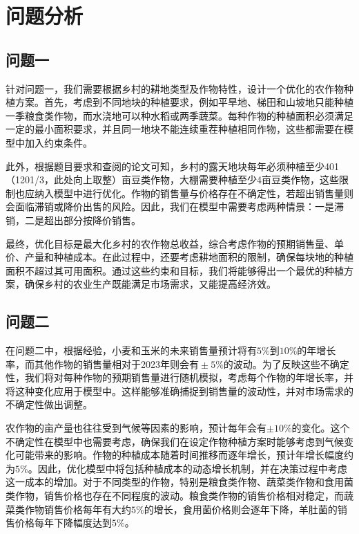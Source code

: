 \chapter[\hspace{0pt}问题分析]{{\heiti{}\hspace{0pt}问题分析}}\label{chapter1: 问题分析}
\removelofgap
\removelotgap

\section[\hspace{-2pt}问题一]{{\heiti{} \hspace{-8pt}问题一}}\label{section1: 问题一}

针对问题一，我们需要根据乡村的耕地类型及作物特性，设计一个优化的农作物种植方案。首先，考虑到不同地块的种植要求，例如平旱地、梯田和山坡地只能种植一季粮食类作物，而水浇地可以种水稻或两季蔬菜。每种作物的种植面积必须满足一定的最小面积要求，并且同一地块不能连续重茬种植相同作物，这些都需要在模型中加入约束条件。

此外，根据题目要求和查阅的论文可知，乡村的露天地块每年必须种植至少401（1201/3，此处向上取整）亩豆类作物，大棚需要种植至少4亩豆类作物，这些限制也应纳入模型中进行优化。作物的销售量与价格存在不确定性，若超出销售量则会面临滞销或降价出售的风险。因此，我们在模型中需要考虑两种情景：一是滞销，二是超出部分按降价销售。

最终，优化目标是最大化乡村的农作物总收益，综合考虑作物的预期销售量、单价、产量和种植成本。在此过程中，还要考虑耕地面积的限制，确保每块地的种植面积不超过其可用面积。通过这些约束和目标，我们将能够得出一个最优的种植方案\cite{JNYZ201508097}，确保乡村的农业生产既能满足市场需求，又能提高经济效。

\section[\hspace{-2pt}问题二]{{\heiti{} \hspace{-8pt}问题二}}\label{section1: 问题二}

在问题二中，根据经验，小麦和玉米的未来销售量预计将有$5\%$到$10\%$的年增长率，而其他作物的销售量相对于2023年则会$有±5\%$的波动。为了反映这些不确定性，我们将对每种作物的预期销售量进行随机模拟，考虑每个作物的年增长率，并将这种变化应用于模型中。这样能够准确捕捉到销售量的波动性，并对市场需求的不确定性做出调整。

农作物的亩产量也往往受到气候等因素的影响\cite{XNMI202517007}，预计每年会有$±10\%$的变化。这个不确定性在模型中也需要考虑，确保我们在设定作物种植方案时能够考虑到气候变化可能带来的影响。作物的种植成本随着时间推移而逐年增长，预计年增长幅度约为$5\%$。因此，优化模型中将包括种植成本的动态增长机制，并在决策过程中考虑这一成本的增加。对于不同类型的作物，特别是粮食类作物、蔬菜类作物和食用菌类作物，销售价格也存在不同程度的波动。粮食类作物的销售价格相对稳定，而蔬菜类作物销售价格每年有大约$5\%$的增长，食用菌价格则会逐年下降，羊肚菌的销售价格每年下降幅度达到$5\%$。

